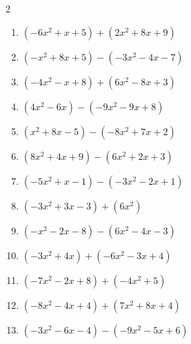 \begin{multicols}{2}
\begin{enumerate}
  \item $(-6x^{2}+x+5)+(2x^{2}+8x+9)$


  \item $(-x^{2}+8x+5)-(-3x^{2}-4x-7)$


  \item $(-4x^{2}-x+8)+(6x^{2}-8x+3)$


  \item $(4x^{2}-6x)-(-9x^{2}-9x+8)$


  \item $(x^{2}+8x-5)-(-8x^{2}+7x+2)$


  \item $(8x^{2}+4x+9)-(6x^{2}+2x+3)$


  \item $(-5x^{2}+x-1)-(-3x^{2}-2x+1)$


  \item $(-3x^{2}+3x-3)+(6x^{2})$


  \item $(-x^{2}-2x-8)-(6x^{2}-4x-3)$


  \item $(-3x^{2}+4x)+(-6x^{2}-3x+4)$


\columnbreak %

\resetques

  \item $(-7x^{2}-2x+8)+(-4x^{2}+5)$


  \item $(-8x^{2}-4x+4)+(7x^{2}+8x+4)$


  \item $(-3x^{2}-6x-4)-(-9x^{2}-5x+6)$



\end{enumerate}
\end{multicols}
